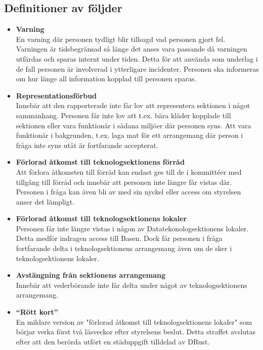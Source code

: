 \documentclass{dtek}
\begin{document}
\subsection{Definitioner av följder}
\begin{itemize}
    \item \textbf{Varning}\\
    En varning där personen tydligt blir tillsagd vad personen gjort fel. Varningen är tidsbegränsad så länge det anses vara passande då varningen utfärdas och sparas internt under tiden. Detta för att använda som underlag i de fall personen är involverad i ytterligare incidenter. Personen ska informeras om hur länge all information kopplad till personen sparas. 

    \item \textbf{Representationsförbud}\\
    Innebär att den rapporterade inte får lov att representera sektionen i något sammanhang. Personen får inte lov att t.ex. bära kläder kopplade till sektionen eller vara funktionär i sådana miljöer där personen syns. Att vara funktionär i bakgrunden, t.ex. laga mat för ett arrangemang där person i fråga inte syns utåt är fortfarande accepterat.
    \item \textbf{Förlorad åtkomst till teknologsektionens förråd}\\
    Att förlora åtkomsten till förråd kan endast ges till de i kommittéer med tillgång till förråd och innebär att personen inte längre får vistas där. Personen i fråga kan även bli av med sin nyckel eller access om styrelsen anser det lämpligt.
    \item \textbf{Förlorad åtkomst till teknologsektionens lokaler}\\
    Personen får inte längre vistas i någon av Datatekonologsektionens lokaler. Detta medför indragen access till Basen. Dock får personen i fråga fortfarande delta i teknologsektionens arrangemang även om de sker i teknologsektionens lokaler. 
    \item \textbf{Avstängning från sektionens arrangemang}\\
    Innebär att vederbörande inte får delta under något av teknologsektionens arrangemang.
    \item \textbf{``Rött kort''}\\
    En mildare version av "förlorad åtkomst till teknologsektionens lokaler" som börjar verka först två läsveckor efter styrelsens beslut. Detta straffet avslutas efter att den berörda utfört en städuppgift tilldelad av DRust.
\end{itemize}
\end{document}
